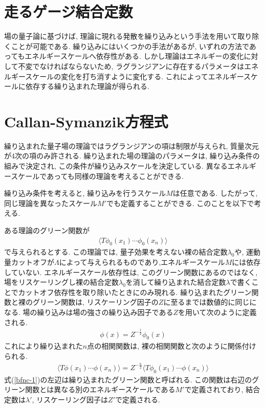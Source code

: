 %
%
\section{走るゲージ結合定数}
場の量子論に基づけば, 理論に現れる発散を繰り込みという手法を用いて取り除くことが可能である.
繰り込みにはいくつかの手法があるが, いずれの方法であってもエネルギースケールへ依存性がある.
しかし理論はエネルギーの変化に対して不変でなければならないため, ラグランジアンに存在するパラメータはエネルギースケールの変化を打ち消すように変化する.
これによってエネルギースケールに依存する繰り込まれた理論が得られる.
\section{Callan-Symanzik方程式}
繰り込まれた量子場の理論ではラグランジアンの項は制限が与えられ, 質量次元が4次の項のみ許される.
繰り込まれた場の理論のパラメータは, 繰り込み条件の組みで決定され, この条件が繰り込みスケールを決定している.
異なるエネルギースケールであっても同様の理論を考えることができる.

繰り込み条件を考えると, 繰り込みを行うスケール$M$は任意である.
したがって, 同じ理論を異なったスケール$M'$でも定義することができる.
このことを以下で考える. 

ある理論のグリーン関数が
\begin{align}
  \langle T \phi_0(x_1)\cdots\phi_0(x_n)\rangle  \label{rescale1}
\end{align}
で与えられるとする.
この理論では, 量子効果を考えない裸の結合定数$\lambda_0$や, 運動量カットオフが$\Lambda$によって与えられるものであり,エネルギースケール$M$には依存していない.
エネルギースケール依存性は, このグリーン関数にあるのではなく, 場をリスケーリングし裸の結合定数$\lambda_0$を消して繰り込まれた結合定数$\lambda$で書くことでカットオフ依存性を取り除いたときにのみ現れる.
繰り込まれたグリーン関数と裸のグリーン関数は, リスケーリング因子の$Z$に至るまでは数値的に同じになる.
場の繰り込みは場の強さの繰り込み因子である$Z$を用いて次のように定義される.
\begin{align}
  \phi(x) = Z^{-\frac{1}{2}}\phi_0(x) \label{bfnc-2}
\end{align}
これにより繰り込まれた$n$点の相関関数は, 裸の相関関数と次のように関係付けられる.
\begin{align}
  \langle T \phi(x_1)\cdots \phi(x_n)\rangle = Z^{-\frac{n}{2}}\langle T \phi_0(x_1)\cdots \phi(x_n)\rangle \label{bfnc-1}
\end{align}
式(\ref{bfnc-1})の左辺は繰り込まれたグリーン関数と呼ばれる.
この関数は右辺のグリーン関数とは異なる別のエネルギースケールである$M'$で定義されており, 結合定数は$\lambda'$, リスケーリング因子は$Z'$で定義される.

